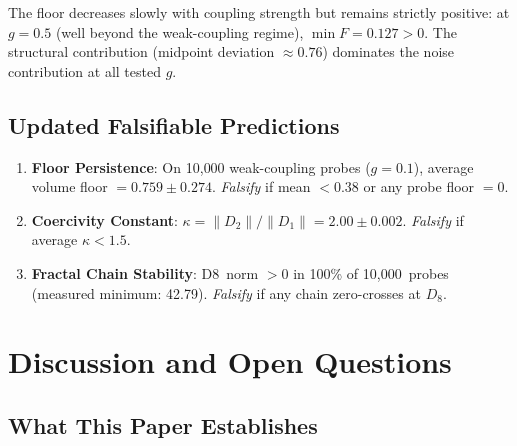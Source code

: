 \documentclass[11pt]{article}
\begin{document}
The floor decreases slowly with coupling strength but remains
strictly positive: at $g = 0.5$ (well beyond the weak-coupling
regime), $\min F = 0.127 > 0$.  The structural contribution
(midpoint deviation $\approx 0.76$) dominates the noise
contribution at all tested $g$.

\subsection{Updated Falsifiable Predictions}
\label{ssec:ym3-predictions}

\begin{enumerate}
  \item \textbf{Floor Persistence}: On 10{,}000 weak-coupling probes
    ($g = 0.1$), average volume floor $= 0.759 \pm 0.274$.
    \emph{Falsify} if mean $< 0.38$ or any probe floor $= 0$.
  \item \textbf{Coercivity Constant}: $\kappa = \|D_2\|/\|D_1\|
    = 2.00 \pm 0.002$.  \emph{Falsify} if average $\kappa < 1.5$.
  \item \textbf{Fractal Chain Stability}: D8~norm $> 0$ in 100\%
    of 10{,}000~probes (measured minimum: 42.79).
    \emph{Falsify} if any chain zero-crosses at $D_8$.
\end{enumerate}

\section{Discussion and Open Questions}
\label{sec:discussion}

\subsection{What This Paper Establishes}
\end{document}
